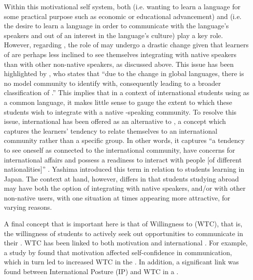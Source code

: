 \documentclass[output=paper]{langsci/langscibook}
\begin{document}
\largerpage
Within this motivational self system, both  (i.e. wanting to learn a language for some practical purpose such as economic or educational advancement) and  (i.e. the desire to learn a language in order to communicate with the language's speakers and out of an interest in the language's culture) play a key role. However, regarding , the role of  may undergo a drastic change given that learners of  are perhaps less inclined to see themselves integrating with native speakers than with other non-native  speakers, as discussed above. This issue has been highlighted by \citet[7]{Dailey2009}, who states that “due to the change in global languages, there is no model community to identify with, consequently leading to a broader classification of .” This implies that in a context of international students using  as a common language, it makes little sense to gauge the extent to which these students wish to integrate with a native -speaking community. To resolve this issue, international  has been offered as an alternative to  \citep{Yashima2009}, a concept which captures the learners’ tendency to relate themselves to an international community rather than a specific  group. In other words, it captures “a tendency to see oneself as connected to the international community, have concerns for international affairs and possess a readiness to interact with people [of different nationalities]” \citep[3]{Yashima2002}. Yashima introduced this term in relation to  students learning  in Japan. The context at hand, however, differs in that students studying abroad may have both the option of integrating with native  speakers, and/or with other non-native  users, with one situation at times appearing more attractive, for varying reasons. 

A final concept that is important here is that of Willingness to  (WTC), that is, the willingness of students to actively seek out opportunities to communicate in their . WTC has been linked to both motivation and international . For example, a study by \citet{Yashima2002} found that motivation affected self-confidence in  communication, which in turn led to increased WTC in the . In addition, a significant link was found between International Posture (IP) and {WTC} in a .
\end{document}
